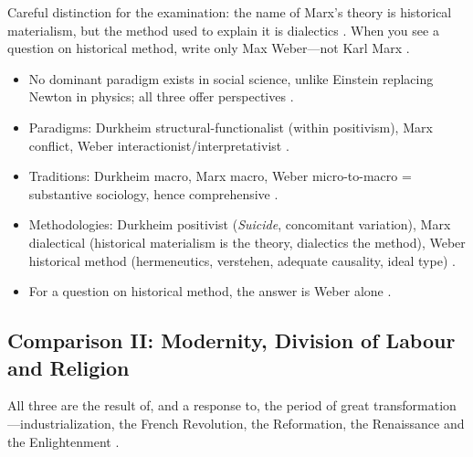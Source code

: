 \begin{PYQLink}
Careful distinction for the examination: the name of Marx's theory is historical materialism, but the method used to explain it is dialectics .
When you see a question on historical method, write only Max Weber---not Karl Marx .
\end{PYQLink}

\begin{QuickRevision}
\begin{itemize}
    \item No dominant paradigm exists in social science, unlike Einstein replacing Newton in physics; all three offer perspectives .
    \item Paradigms: Durkheim structural-functionalist (within positivism), Marx conflict, Weber interactionist/interpretativist .
    \item Traditions: Durkheim macro, Marx macro, Weber micro-to-macro = substantive sociology, hence comprehensive .
    \item Methodologies: Durkheim positivist (\textit{Suicide}, concomitant variation), Marx dialectical (historical materialism is the theory, dialectics the method), Weber historical method (hermeneutics, verstehen, adequate causality, ideal type) .
    \item For a question on historical method, the answer is Weber alone .
\end{itemize}
\end{QuickRevision}

\subsection{Comparison II: Modernity, Division of Labour and Religion}
All three are the result of, and a response to, the period of great transformation---industrialization, the French Revolution, the Reformation, the Renaissance and the Enlightenment .

